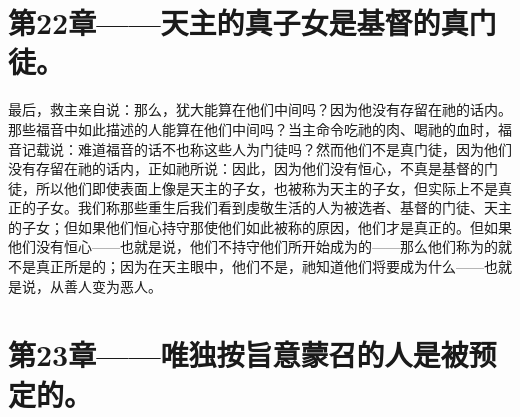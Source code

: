 
\section{第22章——天主的真子女是基督的真门徒。}

最后，救主亲自说：那么，犹大能算在他们中间吗？因为他没有存留在祂的话内。那些福音中如此描述的人能算在他们中间吗？当主命令吃祂的肉、喝祂的血时，福音记载说：难道福音的话不也称这些人为门徒吗？然而他们不是真门徒，因为他们没有存留在祂的话内，正如祂所说：因此，因为他们没有恒心，不真是基督的门徒，所以他们即使表面上像是天主的子女，也被称为天主的子女，但实际上不是真正的子女。我们称那些重生后我们看到虔敬生活的人为被选者、基督的门徒、天主的子女；但如果他们恒心持守那使他们如此被称的原因，他们才是真正的。但如果他们没有恒心——也就是说，他们不持守他们所开始成为的——那么他们称为的就不是真正所是的；因为在天主眼中，他们不是，祂知道他们将要成为什么——也就是说，从善人变为恶人。\par


\section{第23章——唯独按旨意蒙召的人是被预定的。}

